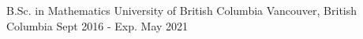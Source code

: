 
\begin{cventries}

  \cventry
    {B.Sc. in Mathematics} %
    {University of British Columbia} %
    {Vancouver, British Columbia} %
    {Sept 2016 - Exp. May 2021} %
    {}

\end{cventries}
